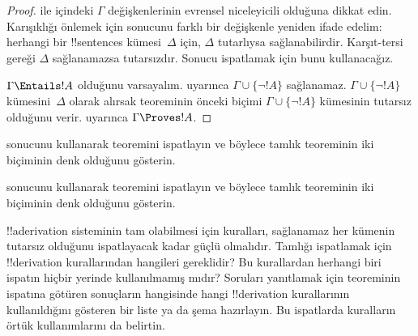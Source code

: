 \begin{proof}
 ile  içindeki
$\Gamma$ değişkenlerinin evrensel niceleyicili olduğuna dikkat edin.
Karışıklığı önlemek için  sonucunu farklı bir
değişkenle yeniden ifade edelim: herhangi bir !!{sentence}s
kümesi~$\Delta$ için, $\Delta$ tutarlıysa sağlanabilirdir. Karşıt-tersi
gereği $\Delta$ sağlanamazsa tutarsızdır. Sonucu ispatlamak için
bunu kullanacağız.

$\Gamma\Entails !A$ olduğunu varsayalım.
 uyarınca
$\Gamma\cup\{\lnot !A\}$ sağlanamaz. $\Gamma\cup\{\lnot !A\}$
kümesini~$\Delta$ olarak alırsak  teoreminin
önceki biçimi $\Gamma\cup\{\lnot !A\}$ kümesinin tutarsız olduğunu verir.
uyarınca $\Gamma\Proves !A$.
\end{proof}

\begin{prob}
 sonucunu kullanarak
 teoremini ispatlayın ve böylece
tamlık teoreminin iki biçiminin denk olduğunu gösterin.
\end{prob}
\tagendprob

\begin{prob}
 sonucunu kullanarak
 teoremini ispatlayın ve böylece
tamlık teoreminin iki biçiminin denk olduğunu gösterin.
\end{prob}
\tagendprob

\begin{prob}
!!a{derivation} sisteminin tam olabilmesi için kuralları, sağlanamaz
her kümenin tutarsız olduğunu ispatlayacak kadar güçlü olmalıdır.
Tamlığı ispatlamak için !!{derivation} kurallarından hangileri
gereklidir? Bu kurallardan herhangi biri ispatın hiçbir yerinde
kullanılmamış mıdır? Soruları yanıtlamak için
 teoreminin ispatına götüren
sonuçların hangisinde hangi !!{derivation} kurallarının kullanıldığını
gösteren bir liste ya da şema hazırlayın. Bu ispatlarda kuralların
örtük kullanımlarını da belirtin.
\end{prob}
\tagendprob

